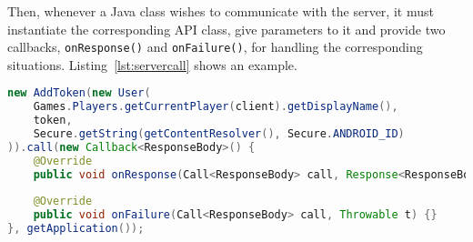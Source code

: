 Then, whenever a Java class wishes to communicate with the server, it must 
instantiate the corresponding API class, give parameters to it and provide
two callbacks, \texttt{onResponse()} and \texttt{onFailure()}, for handling the
corresponding situations. Listing~\ref{lst:servercall} shows an example.

\begin{lstlisting}[language=Java, caption={Server call example}, label={lst:servercall}]
new AddToken(new User(
	Games.Players.getCurrentPlayer(client).getDisplayName(),
	token,
	Secure.getString(getContentResolver(), Secure.ANDROID_ID)
)).call(new Callback<ResponseBody>() {
	@Override
	public void onResponse(Call<ResponseBody> call, Response<ResponseBody> response) {}
	
	@Override
	public void onFailure(Call<ResponseBody> call, Throwable t) {}
}, getApplication());
\end{lstlisting}
